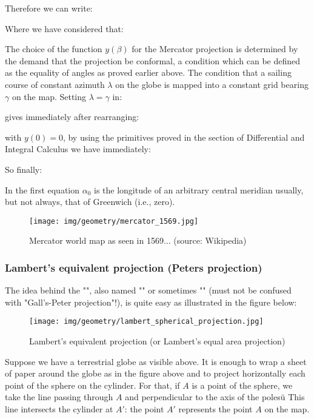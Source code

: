 	Therefore we can write:
	
	Where we have considered that:
	
	The choice of the function $y(\beta)$ for the Mercator projection is determined by the demand that the projection be conformal, a condition which can be defined as the equality of angles as proved earlier above. The condition that a sailing course of constant azimuth $\lambda$ on the globe is mapped into a constant grid bearing $\gamma$ on the map. Setting $\lambda = \gamma$ in:
	
 	gives immediately after rearranging:
	
	with $y(0) = 0$, by using the primitives proved in the section of Differential and Integral Calculus we have immediately:
	
	So finally:
	
	In the first equation $\alpha_0$ is the longitude of an arbitrary central meridian usually, but not always, that of Greenwich (i.e., zero).
	
	\begin{figure}[H]
		\centering
		\texttt{[image: img/geometry/mercator\_1569.jpg]}
		\caption[Mercator world map as seen in 1569]{Mercator world map as seen in 1569... (source: Wikipedia)}
	\end{figure}
	
	\subsubsection{Lambert's equivalent projection (Peters projection)}
	The idea behind the "", also named "" or sometimes "" (must not be confused with "Gall's-Peter projection"!), is quite easy as illustrated in the figure below:
	\begin{figure}[H]
		\centering
		\texttt{[image: img/geometry/lambert\_spherical\_projection.jpg]}
		\caption{Lambert's equivalent projection (or Lambert's equal area projection)}
	\end{figure}
	Suppose we have a terrestrial globe as visible above. It is enough to wrap a sheet of paper around the globe as in the figure above and to project horizontally each point of the sphere on the cylinder. For that, if $A$ is a point of the sphere, we take the line passing through $A$ and perpendicular to the axis of the polesü This line intersects the cylinder at $A'$: the point $A'$ represents the point $A$ on the map.
	
